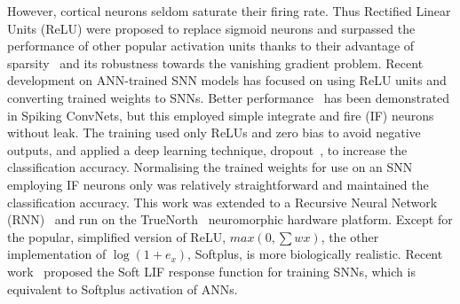 However, cortical neurons seldom saturate their firing rate.
Thus Rectified Linear Units (ReLU) were proposed to replace sigmoid neurons and surpassed the performance of other popular activation units thanks to their advantage of sparsity~\cite{glorot2011deep} and its robustness towards the vanishing gradient problem. %
Recent development on ANN-trained SNN models has focused on using ReLU units and converting trained weights to SNNs.
Better performance~\cite{cao2015spiking,diehl2015fast} has been demonstrated in Spiking ConvNets, but this employed simple integrate and fire (IF) neurons without leak.
The training used only ReLUs and zero bias to avoid negative outputs, and applied a deep learning technique, dropout~\cite{srivastava2014dropout}, to increase the classification accuracy.
Normalising the trained weights for use on an SNN employing IF neurons only was relatively straightforward and maintained the classification accuracy.
This work was extended to a Recursive Neural Network (RNN)~\cite{diehl2016conversion} and run on the TrueNorth~\cite{merolla2014million} neuromorphic hardware platform.
Except for the popular, simplified version of ReLU, $max(0,\sum w x)$, the other implementation of $\log(1+e_x)$, Softplus, is more biologically realistic.
Recent work~\cite{hunsberger2015spiking} proposed the Soft LIF response function for training SNNs, which is equivalent to Softplus activation of ANNs.
	
